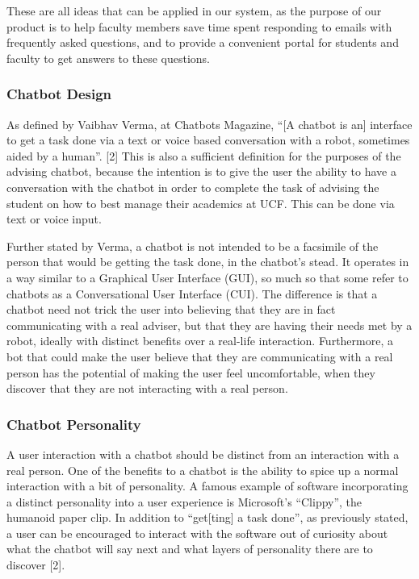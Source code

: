 \documentclass[titlepage, 12pt]{article}
\begin{document}
These are all ideas that can be applied in our system, as the purpose of our product is to help faculty members save time spent responding to emails with frequently asked questions, and to provide a convenient portal for students and faculty to get answers to these questions.

\subsubsection{Chatbot Design}

As defined by Vaibhav Verma, at Chatbots Magazine, “[A chatbot is an] interface to get a task done via a text or voice based conversation with a robot, sometimes aided by a human”. [2] This is also a sufficient definition for the purposes of the advising chatbot, because the intention is to give the user the ability to have a conversation with the chatbot in order to complete the task of advising the student on how to best manage their academics at UCF. This can be done via text or voice input.

Further stated by Verma, a chatbot is not intended to be a facsimile of the person that would be getting the task done, in the chatbot’s stead. It operates in a way similar to a Graphical User Interface (GUI), so much so that some refer to chatbots as a Conversational User Interface (CUI). The difference is that a chatbot need not trick the user into believing that they are in fact communicating with a real adviser, but that they are having their needs met by a robot, ideally with distinct benefits over a real-life interaction. Furthermore, a bot that could make the user believe that they are communicating with a real person has the potential of making the user feel uncomfortable, when they discover that they are not interacting with a real person.

\subsubsection{Chatbot Personality}

A user interaction with a chatbot should be distinct from an interaction with a real person. One of the benefits to a chatbot is the ability to spice up a normal interaction with a bit of personality. A famous example of software incorporating a distinct personality into a user experience is Microsoft’s “Clippy”, the humanoid paper clip. In addition to “get[ting] a task done”, as previously stated, a user can be encouraged to interact with the software out of curiosity about what the chatbot will say next and what layers of personality there are to discover [2].
 
\end{document}

